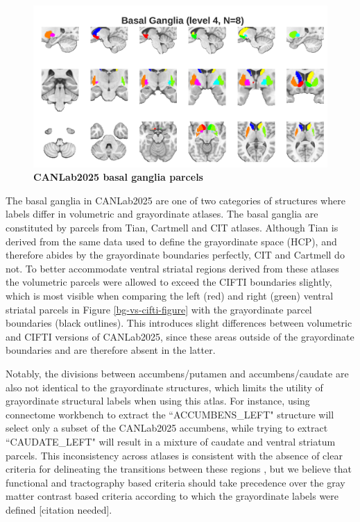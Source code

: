 \documentclass[10pt,letterpaper]{article}
\begin{document}
\begin{figure}[t]
\begin{minipage}{\linewidth}
\end{minipage}
\begin{minipage}{\linewidth}
\includegraphics[width=\linewidth]{images/bg_coarsest.png}
\end{minipage}
\caption{
{\bf
CANLab2025 basal ganglia parcels} 
}
\label{bg-granularities-figure}
\end{figure}

The basal ganglia in CANLab2025 are one of two categories of structures where labels differ in volumetric and grayordinate atlases. The basal ganglia are constituted by parcels from Tian, Cartmell and CIT atlases. Although Tian is derived from the same data used to define the grayordinate space (HCP), and therefore abides by the grayordinate boundaries perfectly, CIT and Cartmell do not. To better accommodate ventral striatal regions derived from these atlases the volumetric parcels were allowed to exceed the CIFTI boundaries slightly, which is most visible when comparing the left (red) and right (green) ventral striatal parcels in Figure \ref{bg-vs-cifti-figure} with the grayordinate parcel boundaries (black outlines). This introduces slight differences between volumetric and CIFTI versions of CANLab2025, since these areas outside of the grayordinate boundaries and are therefore absent in the latter. 

Notably, the divisions between accumbens/putamen and accumbens/caudate are also not identical to the grayordinate structures, which limits the utility of grayordinate structural labels when using this atlas. For instance, using connectome workbench to extract the ``ACCUMBENS\_LEFT" structure will select only a subset of the CANLab2025 accumbens, while trying to extract ``CAUDATE\_LEFT" will result in a mixture of caudate and ventral striatum parcels. This inconsistency across atlases is consistent with the absence of clear criteria for delineating the transitions between these regions , but we believe that functional  and tractography based criteria  should take precedence over the gray matter contrast based criteria according to which the grayordinate labels were defined [citation needed].
\end{document}
